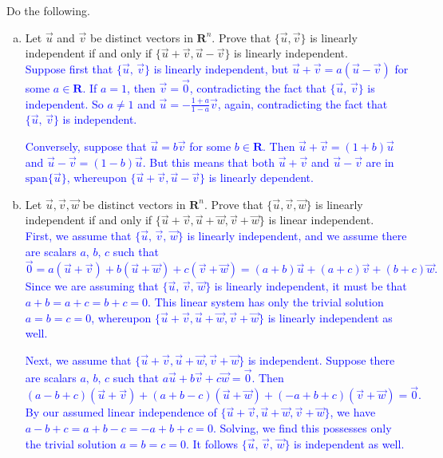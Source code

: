 \documentclass[a4paper,11pt]{article}
\newcommand{\R}{\mathbf{R}}
\newcommand{\BB}[1]{\textcolor{blue}{#1}}
\begin{document}
 Do the following.
\begin{enumerate}[(a)]
\item Let $\vec u$ and $\vec v$ be distinct vectors in $\R^n$. Prove that
  $\{\vec u, \vec v\}$ is linearly independent if and only if $\{\vec u + \vec v,
  \vec u - \vec v\}$ is linearly independent. \\

  \BB{ Suppose first that $\{\vec u,\,\vec v\}$ is linearly independent, but
$\vec u + \vec v = a(\vec u - \vec v)$ for some $a \in \R$. If $a=1$, then $\vec
v=\vec 0$, contradicting the fact that $\{\vec u,\,\vec v\}$ is independent. So
$a \neq 1$ and $\vec u = -\frac{1+a}{1-a}\vec v$, again, contradicting the fact
that $\{\vec u,\,\vec v\}$ is independent.}

\BB{Conversely, suppose that $\vec u = b\vec v$ for some $b \in \R$. Then $\vec
u + \vec v = (1+b)\vec u$ and $\vec u - \vec v = (1-b)\vec u$. But this means
that both $\vec u + \vec v$ and $\vec u - \vec v$ are in $\text{span}\{\vec
u\}$, whereupon $\{\vec u + \vec v, \vec u - \vec v\}$ is linearly dependent.
\\}
  
\item Let $\vec u, \vec v, \vec w$ be distinct vectors in $\R^n$. Prove that
  $\{\vec u, \vec v, \vec w\}$ is linearly independent if and only if $\{\vec
  u+\vec v,\vec u+\vec w,\vec v+\vec w\}$ is linear independent. \\

  \BB{First, we assume that $\{\vec u,\,\vec v,\,\vec w\}$ is linearly
    independent, and we assume there are scalars $a,\,b,\,c$ such that
    \[
      \vec 0 = a(\vec u+\vec v)+b(\vec u+\vec w)+c(\vec v+\vec w)
      = (a+b)\vec u+(a+c)\vec v+(b+c)\vec w.
    \]
    Since we are assuming that $\{\vec u,\,\vec v,\,\vec w\}$ is linearly
    independent, it must be that $a+b=a+c=b+c=0$. This linear system has only
    the trivial solution $a=b=c=0$, whereupon $\{\vec u+\vec v,\vec u+\vec
    w,\vec v+\vec w\}$ is linearly independent as well.
  }

  \BB{Next, we assume that $\{\vec u+\vec v,\vec u+\vec w,\vec v+\vec w\}$ is
    independent. Suppose there are scalars $a,\,b,\,c$ such that $a\vec u+b\vec
    v+c\vec w=\vec 0$. Then
    \[
      (a-b+c)(\vec u+\vec v)+(a+b-c)(\vec u+\vec w)+(-a+b+c)(\vec v+\vec w)=\vec 0.
    \]
    By our assumed linear independence of $\{\vec u+\vec v,\vec u+\vec w,\vec
    v+\vec w\}$, we have $a-b+c=a+b-c=-a+b+c=0$. Solving, we find this possesses
    only the trivial solution $a=b=c=0$. It follows $\{\vec u,\,\vec v,\,\vec
    w\}$ is independent as well. \\}
\end{enumerate}
\end{document}
